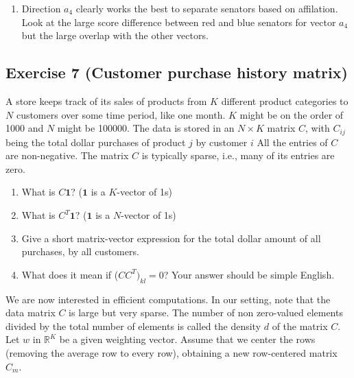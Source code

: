 \documentclass[11pt]{article}
\begin{document}
\begin{solution}
\begin{enumerate}
\begin{figure}[H]
    \end{figure}
    \item Direction $a_4$ clearly works the best to separate senators based on affilation. Look at the large score difference between red and blue senators for vector $a_4$ but the large overlap with the other vectors.
\end{enumerate}
\end{solution}

\newpage
\subsection*{Exercise 7 (Customer purchase history matrix)}

A store keeps track of its sales of products from $K$ different
product categories to $N$ customers over some time period, like one month. $K$ might be on the order of 1000 and $N$ might be 100000. The data is stored in an $N \times K$ matrix $C$, with $C_{ij}$ being the total dollar purchases of product $j$ by customer $i$ All the entries of $C$ are non-negative. The matrix $C$ is typically sparse, i.e., many of its entries are zero.

\begin{enumerate}
    \item What is $C \boldsymbol{1}$? ($\boldsymbol{1}$ is a $K$-vector of 1s)

    \item What is $C^T \boldsymbol{1}$? ($\boldsymbol{1}$ is a $N$-vector of 1s)

    \item Give a short matrix-vector expression for the total dollar amount of all purchases, by all customers.

    \item What does it mean if ($CC^T)_{kl} = 0$? Your answer should be simple English.
\end{enumerate}

We are now interested in efficient computations. In our setting, note that the data matrix $C$ is large but very sparse. The number of non zero-valued elements divided by the total number of elements is called the density $d$ of the matrix $C$. Let $w$ in $\mathbb{R}^K$ be a given weighting vector. Assume that we center the rows (removing the average row to every row), obtaining a new row-centered matrix $C_m$.
\end{document}
